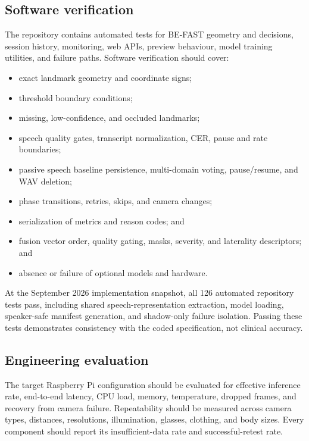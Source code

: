 \documentclass[11pt,a4paper]{article}
\begin{document}
\subsection{Software verification}

The repository contains automated tests for BE-FAST geometry and decisions, session history, monitoring, web APIs, preview behaviour, model training utilities, and failure paths. Software verification should cover:

\begin{itemize}
  \item exact landmark geometry and coordinate signs;
  \item threshold boundary conditions;
  \item missing, low-confidence, and occluded landmarks;
  \item speech quality gates, transcript normalization, CER, pause and rate boundaries;
  \item passive speech baseline persistence, multi-domain voting, pause/resume, and WAV deletion;
  \item phase transitions, retries, skips, and camera changes;
  \item serialization of metrics and reason codes; and
  \item fusion vector order, quality gating, masks, severity, and laterality descriptors; and
  \item absence or failure of optional models and hardware.
\end{itemize}

At the September 2026 implementation snapshot, all 126 automated repository tests pass, including shared speech-representation extraction, model loading, speaker-safe manifest generation, and shadow-only failure isolation. Passing these tests demonstrates consistency with the coded specification, not clinical accuracy.

\subsection{Engineering evaluation}

The target Raspberry Pi configuration should be evaluated for effective inference rate, end-to-end latency, CPU load, memory, temperature, dropped frames, and recovery from camera failure. Repeatability should be measured across camera types, distances, resolutions, illumination, glasses, clothing, and body sizes. Every component should report its insufficient-data rate and successful-retest rate.
\end{document}
